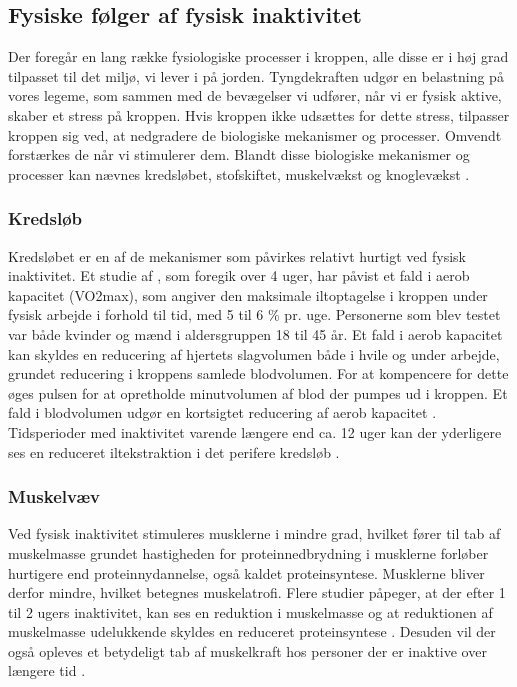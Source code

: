 \subsection{Fysiske følger af fysisk inaktivitet}
Der foregår en lang række fysiologiske processer i kroppen, alle disse er i høj grad tilpasset til det miljø, vi lever i på jorden. 
Tyngdekraften udgør en belastning på vores legeme, som sammen med de bevægelser vi udfører, når vi er fysisk aktive, skaber et stress på kroppen. 
Hvis kroppen ikke udsættes for dette stress, tilpasser kroppen sig ved, at nedgradere de biologiske mekanismer og processer. Omvendt forstærkes de når vi stimulerer dem. 
Blandt disse biologiske mekanismer og processer kan nævnes kredsløbet, stofskiftet, muskelvækst og knoglevækst \citep{motionsraad2007}.

\subsubsection{Kredsløb}
Kredsløbet er en af de mekanismer som påvirkes relativt hurtigt ved fysisk inaktivitet. 
Et studie af \citeauthor{Convertino1995}, som foregik over 4 uger, har påvist et fald i aerob kapacitet (VO2max), som angiver den maksimale iltoptagelse i kroppen under fysisk arbejde i forhold til tid, med 5 til 6 \% pr. uge. 
Personerne som blev testet var både kvinder og mænd i aldersgruppen 18 til 45 år. 
Et fald i aerob kapacitet kan skyldes en reducering af hjertets slagvolumen både i hvile og under arbejde, grundet reducering i kroppens samlede blodvolumen. 
For at kompencere for dette øges pulsen for at opretholde minutvolumen af blod der pumpes ud i kroppen. 
Et fald i blodvolumen udgør en kortsigtet reducering af aerob kapacitet \citep{Convertino1995}. 
Tidsperioder med inaktivitet varende længere end ca. 12 uger kan der yderligere ses en reduceret iltekstraktion i det perifere kredsløb \citep{Coyle1985}.

\subsubsection{Muskelvæv}
Ved fysisk inaktivitet stimuleres musklerne i mindre grad, hvilket fører til tab af muskelmasse grundet hastigheden for proteinnedbrydning i musklerne forløber hurtigere end proteinnydannelse, også kaldet proteinsyntese. 
Musklerne bliver derfor mindre, hvilket betegnes muskelatrofi. 
Flere studier påpeger, at der efter 1 til 2 ugers inaktivitet, kan ses en reduktion i muskelmasse og at reduktionen af muskelmasse udelukkende skyldes en reduceret proteinsyntese \citep{Douglas2006, Bloomfield1995}. 
Desuden vil der også opleves et betydeligt tab af muskelkraft hos personer der er inaktive over længere tid \citep{Bloomfield1995}. 

